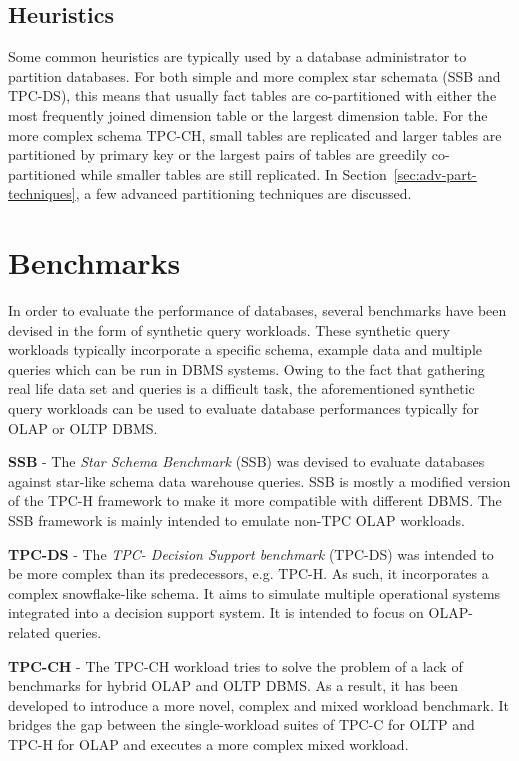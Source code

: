 \subsection{Heuristics}
Some common heuristics are typically used by a database administrator \cite{zamanian2015locality} to partition databases. For both simple and more complex star schemata (SSB and TPC-DS), this means that usually fact tables are co-partitioned with either the most frequently joined dimension table or the largest dimension table. For the more complex schema TPC-CH, small tables are replicated and larger tables are partitioned by primary key or the largest pairs of tables are greedily co-partitioned while smaller tables are still replicated. In Section~\ref{sec:adv-part-techniques}, a few advanced partitioning techniques are discussed.

\section{Benchmarks}
\label{benchmarks}
In order to evaluate the performance of databases, several benchmarks have been devised in the form of synthetic query workloads. These synthetic query workloads typically incorporate a specific schema, example data and multiple queries which can be run in DBMS systems. Owing to the fact that gathering real life data set and queries is a difficult task, the aforementioned synthetic query workloads can be used to evaluate database performances typically for OLAP or OLTP DBMS.

\textbf{SSB} \cite{o2007star} - The \textit{Star Schema Benchmark} (SSB) was devised to evaluate databases against star-like schema data warehouse queries. SSB is mostly a modified version of the TPC-H framework to make it more compatible with different DBMS. The SSB framework is mainly intended to emulate non-TPC OLAP workloads. 

\textbf{TPC-DS} \cite{Nambiar:2006:MT:1182635.1164217} - The \textit{TPC- Decision Support benchmark} (TPC-DS) was intended to be more complex than its predecessors, e.g. TPC-H. As such, it incorporates a complex snowflake-like schema. It aims to simulate multiple operational systems integrated into a decision support system. It is intended to focus on OLAP-related queries.

\textbf{TPC-CH} \cite{Cole:2011:MWC:1988842.1988850} - The TPC-CH workload tries to solve the problem of a lack of benchmarks for hybrid OLAP and OLTP DBMS. As a result, it has been developed to introduce a more novel, complex and mixed workload benchmark. It bridges the gap between the single-workload suites of TPC-C for OLTP and TPC-H for OLAP and executes a more complex mixed workload.

